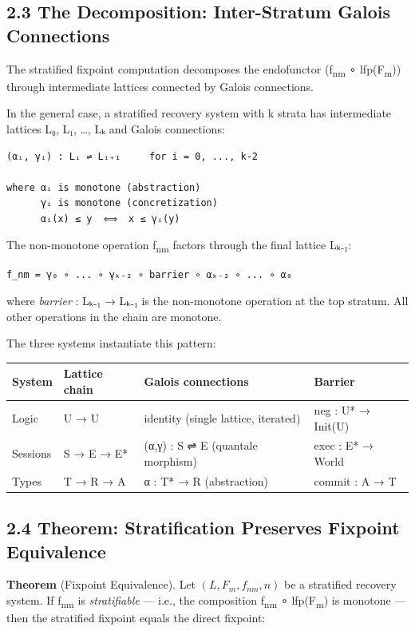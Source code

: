 \documentclass[11pt]{article}
\begin{document}
\subsection{2.3 The Decomposition: Inter-Stratum Galois Connections}
\label{sec:org6fbdade}

The stratified fixpoint computation decomposes the endofunctor
(f\textsubscript{nm} ∘ lfp(F\textsubscript{m})) through intermediate lattices connected by Galois connections.

In the general case, a stratified recovery system with k strata has
intermediate lattices L₀, L₁, \ldots{}, Lₖ and Galois connections:

\begin{verbatim}
(αᵢ, γᵢ) : Lᵢ ⇌ Lᵢ₊₁     for i = 0, ..., k-2

where αᵢ is monotone (abstraction)
      γᵢ is monotone (concretization)
      αᵢ(x) ≤ y  ⟺  x ≤ γᵢ(y)
\end{verbatim}

The non-monotone operation f\textsubscript{nm} factors through the final lattice Lₖ₋₁:

\begin{verbatim}
f_nm = γ₀ ∘ ... ∘ γₖ₋₂ ∘ barrier ∘ αₖ₋₂ ∘ ... ∘ α₀
\end{verbatim}

where \emph{barrier} : Lₖ₋₁ → Lₖ₋₁ is the non-monotone operation at the top
stratum. All other operations in the chain are monotone.

The three systems instantiate this pattern:

\begin{center}
\begin{tabular}{llll}
System & Lattice chain & Galois connections & Barrier\\
\hline
Logic & U → U & identity (single lattice, iterated) & neg : U* → Init(U)\\
Sessions & S → E → E* & (α,γ) : S ⇌ E (quantale morphism) & exec : E* → World\\
Types & T → R → A & α : T* → R (abstraction) & commit : A → T\\
\end{tabular}
\end{center}
\subsection{2.4 Theorem: Stratification Preserves Fixpoint Equivalence}
\label{sec:org61786d8}

\textbf{Theorem} (Fixpoint Equivalence). Let \((L, F_m, f_{nm}, n)\) be a stratified
recovery system. If f\textsubscript{nm} is \emph{stratifiable} — i.e., the composition
f\textsubscript{nm} ∘ lfp(F\textsubscript{m}) is monotone — then the stratified fixpoint equals the direct
fixpoint:
\end{document}
